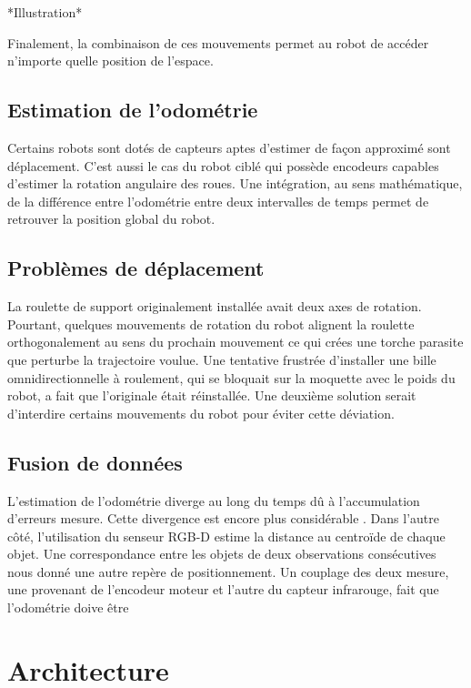 *Illustration*

Finalement, la combinaison de ces mouvements permet au robot de
accéder n'importe quelle position de l’espace.

\subsection{Estimation de l'odométrie}

Certains robots sont dotés de capteurs aptes d'estimer de façon
approximé sont déplacement. C'est aussi le cas du robot ciblé qui
possède encodeurs capables d'estimer la rotation angulaire des
roues. Une intégration, au sens mathématique, de la différence entre
l'odométrie entre deux intervalles de temps permet de retrouver la
position global du robot.

\subsection{Problèmes de déplacement}

La roulette de support originalement installée avait deux axes de
rotation. Pourtant, quelques mouvements de rotation du robot alignent
la roulette orthogonalement au sens du prochain mouvement ce qui crées
une torche parasite que perturbe la trajectoire voulue. Une tentative
frustrée d'installer une bille omnidirectionnelle à roulement, qui se
bloquait sur la moquette avec le poids du robot, a fait que
l'originale était réinstallée. Une deuxième solution serait d'interdire
certains mouvements du robot pour éviter cette déviation.

\subsection{Fusion de données}

L'estimation de l’odométrie diverge au long du temps dû à
l'accumulation d'erreurs mesure. Cette divergence est encore plus
considérable . Dans l'autre côté, l'utilisation du senseur RGB-D
estime la distance au centroïde de chaque objet. Une correspondance
entre les objets de deux observations consécutives nous donné une
autre repère de positionnement. Un couplage des deux mesure, une
provenant de l’encodeur moteur et l'autre du capteur infrarouge, fait
que l'odométrie doive être

\section{Architecture}

